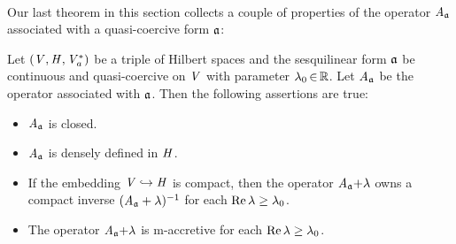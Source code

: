\documentclass[11pt,twoside]{article}
\begin{document}
\paragraph{} %
Our last theorem in this section
collects a couple of properties of the operator $\mathit{A}_{\mathfrak{a}}$
associated with a quasi-coercive form $\mathfrak{a}$:

\begin{theorem}\label{QUASI-COERCIVE_FORMS_AND_ASSOCIATED_OPERATORS}
Let $(\mathit{V},\mathit{H},\mathit{V}_a^*)$ be a triple of Hilbert spaces
and the sesquilinear form $\mathfrak{a}$ be continuous and quasi-coercive
on $\mathit{V}$ with parameter $\lambda_0 {\,\in\,} {\mathbb{R}}$.
Let $\mathit{A}_{\mathfrak{a}}$ be the operator associated with $\mathfrak{a}$.
Then the following assertions are true:

\begin{itemize}[leftmargin=9mm]
\item[(a)]
$\mathit{A}_{\mathfrak{a}}$ is closed.

\item[(b)]
$\mathit{A}_{\mathfrak{a}}$ is densely defined in $\mathit{H}$.

\item[(c)]
If the embedding $\mathit{V} \hookrightarrow \mathit{H}$ is {compact},
then the operator $\mathit{A}_{\mathfrak{a}} {+} \lambda$
owns a compact inverse $(\mathit{A}_{\mathfrak{a}} +\lambda)^{-1}$
for each $\operatorname{Re} \lambda \geq \lambda_0$.

\item[(d)]
The operator $\mathit{A}_{\mathfrak{a}} {+} \lambda$ is m-accretive
for each $\operatorname{Re} \lambda \geq \lambda_0$.

\end{itemize}
\end{theorem}
\end{document}
